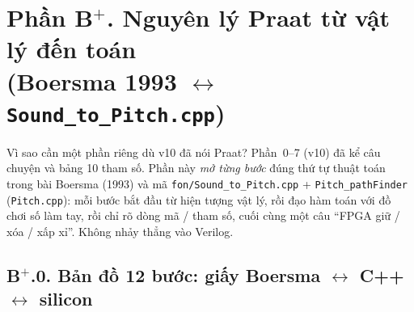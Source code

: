 

\section*{Phần B$^+$. Nguyên lý Praat từ vật lý đến toán\\(Boersma 1993 $\leftrightarrow$ \texttt{Sound\_to\_Pitch.cpp})}

\begin{firstprin}{Vì sao cần một phần riêng dù v10 đã nói Praat?}
Phần~0--7 (v10) đã kể câu chuyện và bảng 10 tham số. Phần này \emph{mở từng bước} đúng thứ tự thuật toán trong bài Boersma (1993) và mã \texttt{fon/Sound\_to\_Pitch.cpp} + \texttt{Pitch\_pathFinder} (\texttt{Pitch.cpp}): mỗi bước bắt đầu từ hiện tượng vật lý, rồi đạo hàm toán với đồ chơi số làm tay, rồi chỉ rõ dòng mã / tham số, cuối cùng một câu ``FPGA giữ / xóa / xấp xỉ''. Không nhảy thẳng vào Verilog.
\end{firstprin}

\subsection*{B$^+$.0. Bản đồ 12 bước: giấy Boersma $\leftrightarrow$ C++ $\leftrightarrow$ silicon}

